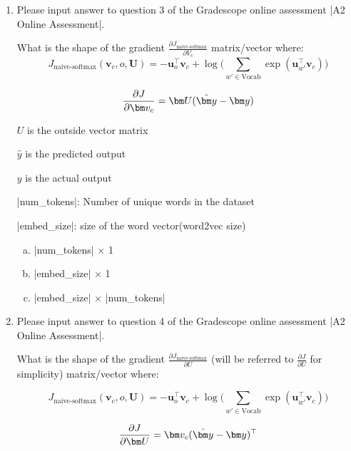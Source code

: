 \begin{enumerate}[1.]

\item {}
Please input answer to question 3 of the Gradescope online assessment |A2 Online Assessment|.

What is the shape of the gradient $\frac{\partial J_\text{naive-softmax}}{\partial V_c}$ matrix/vector where:
\begin{equation*} J_{\text{naive-softmax}}(\bm v_c, o, \bm U) = - \bm u_{o}^\top \bm v_c + \log \bigg( \sum_{w' \in \text{Vocab}} \exp(\bm u_{w'}^\top \bm v_c) \bigg) \end{equation*}

\begin{equation*} {\partial J \over \partial \bm v_c} = \bm U(\hat{\bm y} - \bm y)\end{equation*}

$U$ is the outside vector matrix

$\hat{y}$ is the predicted output

$y$ is the actual output

|num_tokens|: Number of unique words in the dataset

|embed_size|: size of the word vector(word2vec size)

\begin{enumerate}[(a)]
\item |num_tokens| $\times$ 1
\item |embed_size| $\times$ 1
\item |embed_size| $\times$ |num_tokens|
\end{enumerate}


\item {}
Please input answer to question 4 of the Gradescope online assessment |A2 Online Assessment|.

What is the shape of the gradient $\frac{\partial J_\text{naive-softmax}}{\partial U}$ (will be referred to $\frac{\partial J}{\partial U}$ for simplicity) matrix/vector where:

\begin{equation*} J_{\text{naive-softmax}}(\bm v_c, o, \bm U) = - \bm u_{o}^\top \bm v_c + \log \bigg( \sum_{w' \in \text{Vocab}} \exp(\bm u_{w'}^\top \bm v_c) \bigg) \end{equation*}

\begin{equation*} {\partial J \over \partial \bm U } = {\bm v_c} (\hat{\bm y} - \bm y)^\top \end{equation*}


\end{enumerate}

